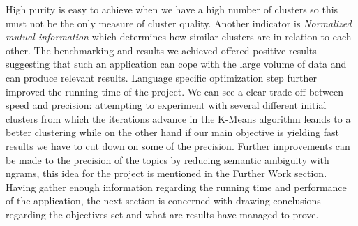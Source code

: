 High purity is easy to achieve when we have a high number of clusters so this must not be the only measure of cluster quality. Another indicator is \textit{Normalized mutual information} which determines how similar clusters are in relation to each other.
\newline
\newline
The benchmarking and results we achieved offered positive results suggesting that such an application can cope with the large volume of data and can produce relevant results.
\newline
Language specific optimization step further improved the running time of the project. We can see a clear trade-off between speed and precision: attempting to experiment with several different initial clusters from which the iterations advance in the K-Means algorithm leands to a better clustering while on the other hand if our main objective is yielding fast results we have to cut down on some of the precision. Further improvements can be made to the precision of the topics by reducing semantic ambiguity with ngrams, this idea for the project is mentioned in the Further Work section.
\newline
Having gather enough information regarding the running time and performance of the application, the next section is concerned with drawing conclusions regarding the objectives set and what are results have managed to prove.
